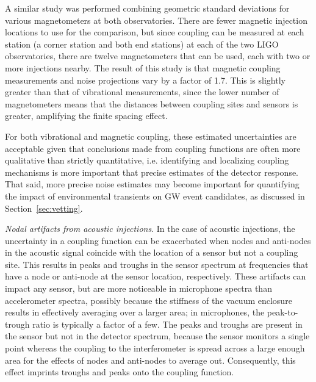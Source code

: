 A similar study was performed combining geometric standard deviations for various magnetometers at both observatories.
There are fewer magnetic injection locations to use for the comparison, but since coupling can be measured at each station (a corner station and both end stations) at each of the two LIGO observatories, there are twelve magnetometers that can be used, each with two or more injections nearby.
The result of this study is that magnetic coupling measurements and noise projections vary by a factor of 1.7.
This is slightly greater than that of vibrational measurements, since the lower number of magnetometers means that the distances between coupling sites and sensors is greater, amplifying the finite spacing effect.

For both vibrational and magnetic coupling, these estimated uncertainties are acceptable given that conclusions made from coupling functions are often more qualitative than strictly quantitative, i.e. identifying and localizing coupling mechanisms is more important that precise estimates of the detector response.
That said, more precise noise estimates may become important for quantifying the impact of environmental transients on \ac{GW} event candidates, as discussed in Section~\ref{sec:vetting}.

\textit{Nodal artifacts from acoustic injections}.
In the case of acoustic injections, the uncertainty in a coupling function can be exacerbated when nodes and anti-nodes in the acoustic signal coincide with the location of a sensor but not a coupling site.
This results in peaks and troughs in the sensor spectrum at frequencies that have a node or anti-node at the sensor location, respectively.
These artifacts can impact any sensor, but are more noticeable in microphone spectra than accelerometer spectra, possibly because the stiffness of the vacuum enclosure results in effectively averaging over a larger area; in microphones, the peak-to-trough ratio is typically a factor of a few.
The peaks and troughs are present in the sensor but not in the detector spectrum, because the sensor monitors a single point whereas the coupling to the interferometer is spread across a large enough area for the effects of nodes and anti-nodes to average out.
Consequently, this effect imprints troughs and peaks onto the coupling function.

